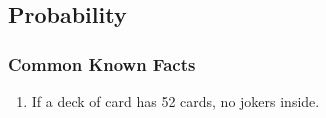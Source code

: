 \subsection{Probability}
\subsubsection{Common Known Facts}
\begin{enumerate}
    \item If a deck of card has 52 cards, no jokers inside.
\end{enumerate}
